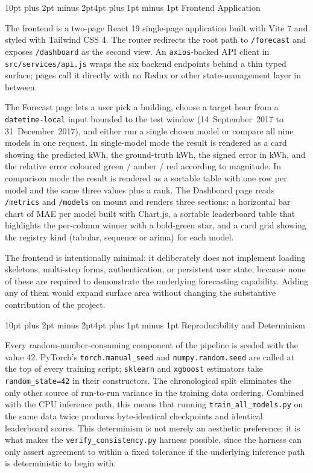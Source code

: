 \documentclass[12pt,a4paper,openany]{report}
\makeatletter
\renewcommand{\section}{\@startsection{section}{1}{\z@}%
  {10pt plus 2pt minus 2pt}{4pt plus 1pt minus 1pt}%
  {\normalfont\normalsize\bfseries}}
\makeatother
\begin{document}
\section{Frontend Application}

The frontend is a two-page React 19 single-page application built with Vite 7 and styled with Tailwind CSS 4. The router redirects the root path to \texttt{/forecast} and exposes \texttt{/dashboard} as the second view. An \texttt{axios}-backed API client in \texttt{src/services/api.js} wraps the six backend endpoints behind a thin typed surface; pages call it directly with no Redux or other state-management layer in between.

The Forecast page lets a user pick a building, choose a target hour from a \texttt{datetime-local} input bounded to the test window (14~September~2017 to 31~December~2017), and either run a single chosen model or compare all nine models in one request. In single-model mode the result is rendered as a card showing the predicted kWh, the ground-truth kWh, the signed error in kWh, and the relative error coloured green / amber / red according to magnitude. In comparison mode the result is rendered as a sortable table with one row per model and the same three values plus a rank. The Dashboard page reads \texttt{/metrics} and \texttt{/models} on mount and renders three sections: a horizontal bar chart of MAE per model built with Chart.js, a sortable leaderboard table that highlights the per-column winner with a bold-green star, and a card grid showing the registry kind (tabular, sequence or arima) for each model.

The frontend is intentionally minimal: it deliberately does not implement loading skeletons, multi-step forms, authentication, or persistent user state, because none of these are required to demonstrate the underlying forecasting capability. Adding any of them would expand surface area without changing the substantive contribution of the project.

\section{Reproducibility and Determinism}

Every random-number-consuming component of the pipeline is seeded with the value 42. PyTorch's \texttt{torch.manual\_seed} and \texttt{numpy.random.seed} are called at the top of every training script; \texttt{sklearn} and \texttt{xgboost} estimators take \texttt{random\_state=42} in their constructors. The chronological split eliminates the only other source of run-to-run variance in the training data ordering. Combined with the CPU inference path, this means that running \texttt{train\_all\_models.py} on the same data twice produces byte-identical checkpoints and identical leaderboard scores. This determinism is not merely an aesthetic preference: it is what makes the \texttt{verify\_consistency.py} harness possible, since the harness can only assert agreement to within a fixed tolerance if the underlying inference path is deterministic to begin with.
\end{document}
